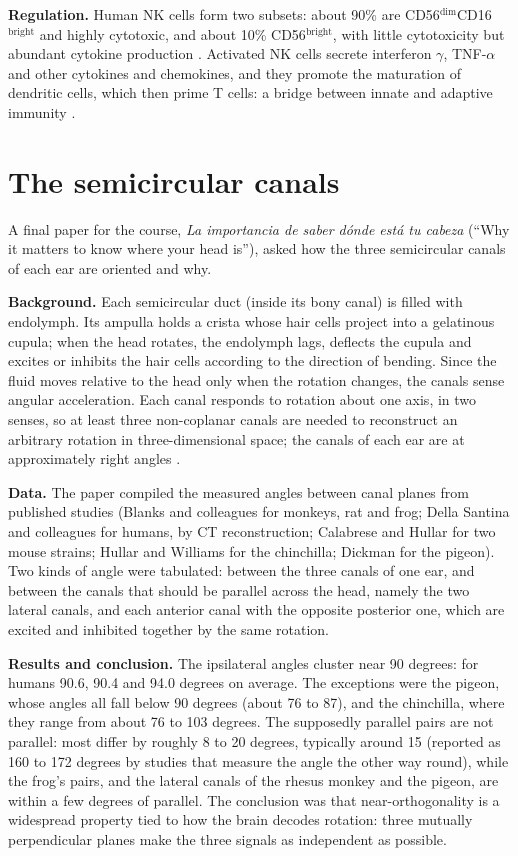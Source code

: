 \textbf{Regulation.} Human NK cells form two
subsets: about 90\% are
CD56$^{\mathrm{dim}}$CD16$^{\mathrm{bright}}$
and highly cytotoxic, and about 10\%
CD56$^{\mathrm{bright}}$, with little
cytotoxicity but abundant cytokine production
\cite{cooper2001nk}. Activated NK cells
secrete interferon $\gamma$, TNF-$\alpha$ and
other cytokines and chemokines, and they
promote the maturation of dendritic cells,
which then prime T cells: a bridge between
innate and adaptive immunity
\cite{munz2005dendritic}.

\section{The semicircular canals}
\label{section-canals}

A final paper for the course, \emph{La importancia de
saber d\'onde est\'a tu cabeza} (``Why it
matters to know where your head is''), asked
how the three semicircular canals of each ear
are oriented and why.

\textbf{Background.} Each semicircular duct
(inside its bony canal) is filled with
endolymph. Its ampulla holds a crista whose
hair cells project into a gelatinous cupula;
when the head rotates, the endolymph lags,
deflects the cupula and excites or inhibits
the hair cells according to the direction of
bending. Since the fluid moves relative to
the head only when the rotation changes, the
canals sense angular acceleration. Each canal
responds to rotation about one axis, in two
senses, so at least three non-coplanar canals
are needed to reconstruct an arbitrary
rotation in three-dimensional space; the
canals of each ear are at approximately right
angles \cite[Chapter 14]{hill2012animal}.

\textbf{Data.} The paper compiled the
measured angles between canal planes from
published studies (Blanks and colleagues for
monkeys, rat and frog; Della Santina and
colleagues for humans, by CT reconstruction;
Calabrese and Hullar for two mouse strains;
Hullar and Williams for the chinchilla;
Dickman for the pigeon). Two kinds of angle
were tabulated: between the three canals of
one ear, and between the canals that should
be parallel across the head, namely the two
lateral canals, and each anterior canal with
the opposite posterior one, which are excited
and inhibited together by the same rotation.

\textbf{Results and conclusion.} The
ipsilateral angles cluster near 90 degrees:
for humans 90.6, 90.4 and 94.0 degrees on
average. The exceptions were the pigeon,
whose angles all fall below 90 degrees (about
76 to 87), and the chinchilla, where they
range from about 76 to 103 degrees. The
supposedly parallel pairs are not parallel:
most differ by roughly 8 to 20 degrees,
typically around 15 (reported as 160 to 172
degrees by studies that measure the angle the
other way round), while the frog's pairs, and
the lateral canals of the rhesus monkey and
the pigeon, are within a few degrees of
parallel. The conclusion was that
near-orthogonality is a widespread property
tied to how the brain decodes rotation: three
mutually perpendicular planes make the three
signals as independent as possible.

